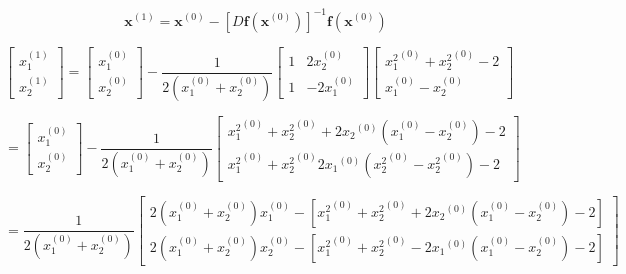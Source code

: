 \documentclass[00-main.tex]{subfiles}
\begin{document}
\begin{equation}
\mathbf{x}^{(1)} = \mathbf{x}^{(0)} - \left[D\mathbf{f}(\mathbf{x}^{(0)})\right]^{-1} \mathbf{f} (\mathbf{x}^{(0)})
\end{equation}

\begin{equation}
\left[ 	
	\begin{array}{cc} 
		x_1^{(1)} \\ 
		x_2^{(1)}
	\end{array} 
\right] 
=
\left[ 	
	\begin{array}{cc} 
		x_1^{(0)} \\ 
		x_2^{(0)}  
	\end{array} 
\right] 
-
\frac{1}{2(x_1^{(0)} + x_2^{(0)})} 
\left[ 	
	\begin{array}{cc} 
		1 & 2x_2^{(0)} \\ 
		1 & -2x_1^{(0)}  
	\end{array} 
\right] 
\left[ 	
	\begin{array}{cc} 
		{x_1^{2}}^{(0)} + {x_2^2}^{(0)} - 2 \\ 
		x_1^{(0)} - x_2^{(0)}  
	\end{array} 
\right] 
\end{equation}

\begin{equation}
=
\left[ 	
	\begin{array}{cc} 
		x_1^{(0)} \\ 
		x_2^{(0)}  
	\end{array} 
\right] 
-
\frac{1}{2(x_1^{(0)} + x_2^{(0)})} 
\left[ 	
	\begin{array}{cc} 
		{x_1^{2}}^{(0)} + {x_2^2}^{(0)} + 2{x_2}^{(0)}(x_1^{(0)}-x_2^{(0)}) - 2 \\ 
		{x_1^{2}}^{(0)} + {x_2^2}^{(0)} 2{x_1}^{(0)}({x_2^2}^{(0)}-{x_2^2}^{(0)}) - 2 
	\end{array}
\right] 
\end{equation}

\begin{equation}
=
\frac{1}{2(x_1^{(0)} + x_2^{(0)})} 
\left[ 	
	\begin{array}{cc} 
		2(x_1^{(0)} + x_2^{(0)})x_1^{(0)} - \left[{x_1^{2}}^{(0)} + {x_2^2}^{(0)} + 2{x_2}^{(0)}(x_1^{(0)}-x_2^{(0)}) - 2 \right]\\ 
		2(x_1^{(0)} + x_2^{(0)})x_2^{(0)} - \left[{x_1^{2}}^{(0)} + {x_2^2}^{(0)} - 2{x_1}^{(0)}(x_1^{(0)}-x_2^{(0)}) - 2 \right]
	\end{array}
\right] 
\end{equation}
\end{document}
